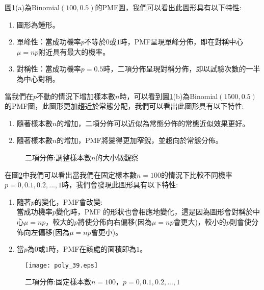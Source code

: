 \documentclass[12pt, a4paper]{article}
\begin{document}
圖\;\ref{fig:parallel3_3}\;(a)\;為\;Binomial$(100,0.5)$\;的PMF圖，我們可以看出此圖形具有以下特性\;:
\begin{enumerate}
\item 圖形為鍾形。
\item 單峰性\;：\;當成功機率\;$p$\;不等於\;$0$\;或\;$1$\;時，PMF呈現單峰分佈，即在對稱中心\;$\mu = np$\;附近具有最大的機率。
\item 對稱性\;：\;當成功機率\;$p=0.5$\;時，二項分佈呈現對稱分佈，即以試驗次數的一半為中心對稱。
\end{enumerate}
當我們在\;$p$\;不動的情況下增加樣本數\;$n$\;時，可以看到圖\;\ref{fig:parallel3_3}\;(b)\;為\;Binomial$(1500,0.5)$\;的PMF圖，此圖形更加趨近於常態分配，我們可以看出此圖形具有以下特性\;:
\begin{enumerate}
\item 隨著樣本數\;$n$\;的增加，二項分佈可以近似為常態分佈的常態近似效果更好。
\item 隨著樣本數\;$n$\;的增加，PMF將變得更加窄銳，並趨向於常態分佈。
\end{enumerate}

\begin{figure}[h]
\centering
{}
\caption{二項分佈\;:\;調整樣本數$n$的大小做觀察}
\label{fig:parallel3_3}
\end{figure}


在圖\;\ref{fig:poly_39.eps}\;中我們可以看出當我們在固定樣本數\;$n=100$\;的情況下比較不同機率\;$p=0,0.1,0.2,...,1$\;時，我們會發現此圖形具有以下特性\;:
\begin{enumerate}
\item 隨著\;$p$\;的變化，PMF會改變\;:\\
當成功機率\;$p$\;變化時，PMF 的形狀也會相應地變化，這是因為圖形會對稱於中心\;$\mu = np$\;，較大的\;$p$\;將使分佈向右偏移(因為\;$\mu = np$\;會更大)，較小的\;$p$\;則會使分佈向左偏移(因為\;$\mu = np$\;會更小)。
\item 當\;$p$\;為\;$0$\;或\;$1$\;時，PMF在該處的面積即為\;$1$\;。
\end{enumerate}

\begin{figure}[H]
\centering
\texttt{[image: poly\_39.eps]}
\caption{二項分佈\;:\;固定樣本數\;$n=100$\;，$p=0,0.1,0.2,...,1$}
\label{fig:poly_39.eps}
\end{figure}
\end{document}
